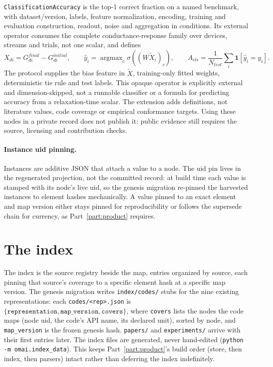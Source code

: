 \documentclass[11pt,a4paper]{article}
\begin{document}
\texttt{ClassificationAccuracy} is the top-1 correct fraction on a named
benchmark, with dataset/version, labels, feature normalization, encoding,
training and evaluation construction, readout, noise and aggregation in
conditions. Its external operator consumes the complete conductance-response
family over devices, streams and trials, not one scalar, and defines
\[
X_{di}=G^{final}_{di}-G^{initial}_{di},\qquad
\widehat y_i=\mathop{\mathrm{argmax}}_c\sigma((W\widetilde X_i)_c),\qquad
A_{cls}=\frac{1}{N_{test}}\sum_i\mathbf{1}[\widehat y_i=y_i].
\]
The protocol supplies the bias feature in $\widetilde X$, training-only fitted
weights, deterministic tie rule and test labels. This opaque operator is
explicitly external and dimension-skipped, not a runnable classifier or a
formula for predicting accuracy from a relaxation-time scalar. The extension
adds definitions, not literature values, code coverage or empirical conformance
targets. Using these nodes in a private record does not publish it: public
evidence still requires the source, licensing and contribution checks.

\paragraph{Instance uid pinning.} Instances are additive JSON that attach a value
to a node. The uid pin lives in the regenerated projection, not the committed
record: at build time each value is stamped with its node's live uid, so the
genesis migration re-pinned the harvested instances to element hashes
mechanically. A value
pinned to an exact element and map version either stays pinned for reproducibility
or follows the supersede chain for currency, as Part~\ref{part:product} requires.

\section{The index}
\label{sec:kernel-index}

The index is the source registry beside the map, entries organized by source,
each pinning that source's coverage to a specific element hash at a specific map
version. The genesis migration writes \texttt{index/codes/} stubs for the nine
existing representations: each \texttt{codes/<rep>.json} is
$\{\texttt{representation}, \texttt{map\_version}, \texttt{covers}\}$, where
\texttt{covers} lists the nodes the code maps (node uid, the code's API name, its
declared unit), sorted by node, and \texttt{map\_version} is the frozen genesis
hash. \texttt{papers/} and \texttt{experiments/} arrive with their first entries
later. The index files are generated, never hand-edited
(\texttt{python -m omai.index\_data}). This keeps Part~\ref{part:product}'s build
order (store, then index, then parsers) intact rather than deferring the index
indefinitely.
\end{document}
